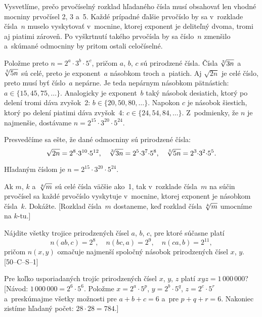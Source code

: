 {%
Vysvetlíme, prečo prvočíselný rozklad hľadaného čísla musí obsahovať
len vhodné mocniny prvočísel 2, 3 a~5. Každé prípadné ďalšie prvočíslo by sa v~rozklade
čísla~$n$ muselo vyskytovať v~mocnine, ktorej exponent je deliteľný dvoma, tromi
aj piatimi zároveň. Po vyškrtnutí takého prvočísla by sa číslo~$n$ zmenšilo
a~skúmané odmocniny by pritom ostali celočíselné.

Položme preto $n=2^a{\cdot}3^b{\cdot}5^c$, pričom $a$, $b$, $c$
sú prirodzené čísla. Čísla $\root3\of{3n}$ a~$\root5\of{5n}$ sú celé,
preto je exponent~$a$ násobkom troch a~piatich. Aj $\sqrt{2n}$ je celé číslo,
preto musí byť číslo~$a$ nepárne. Je teda nepárnym násobkom pätnástich: $a\in\{15,45,75,\dots\}$.
Analogicky je exponent~$b$ taký násobok desiatich, ktorý po delení tromi dáva
zvyšok~2: $b\in\{20,50,80,\dots\}$. Napokon $c$ je násobok šiestich,
ktorý po delení piatimi dáva zvyšok~4: $c\in\{24,54,84,\dots\}$.
Z~podmienky, že $n$ je najmenšie, dostávame $n=2^{15}{\cdot}3^{20}{\cdot}5^{24}$.

Presvedčíme sa ešte, že dané odmocniny sú prirodzené čísla:
$$
\sqrt{2n}=2^{8}{\cdot}3^{10}{\cdot}5^{12},\quad
\root3\of{3n}=2^{5}{\cdot}3^{7}{\cdot}5^{8},\quad
\root5\of{5n}=2^{3}{\cdot}3^{2}{\cdot}5^{5}.
$$

\zaver
Hľadaným číslom je $n=2^{15}{\cdot}3^{20}{\cdot}5^{24}$.

Ak $m$, $k$ a~$\root k\of m$ sú celé čísla väčšie ako~1, tak v~rozklade
čísla~$m$ na súčin prvočísel sa každé prvočíslo vyskytuje v~mocnine, ktorej
exponent je násobkom čísla~$k$. Dokážte. [Rozklad čísla~$m$ dostaneme, keď
rozklad čísla $\root k\of m$ umocníme na $k$-tu.]

\D%
Nájdite všetky trojice prirodzených čísel $a$, $b$, $c$, pre ktoré súčasne
platí
$$
n(ab,c)=2^8,\quad
n(bc,a)=2^9,\quad
n(ca,b)=2^{11},
$$
pričom $n(x,y)$ označuje najmenší spoločný násobok prirodzených čísel $x$, $y$. [50--C--S--1]

Pre koľko usporiadaných trojíc prirodzených čísel $x$, $y$, $z$ platí  $xyz = 1\,000\,000$?
      [Návod: $1\,000\,000=2^6{\cdot}5^6$. Položme $x=2^a{\cdot}5^p$, $y=2^b{\cdot}5^q$, $z=2^c{\cdot}5^r$
      a~preskúmajme všetky možnosti pre $a+b+c=6$  a~pre $p+q+r=6$.
      Nakoniec zistíme hľadaný počet: $28\cdot28=784$.]
}

